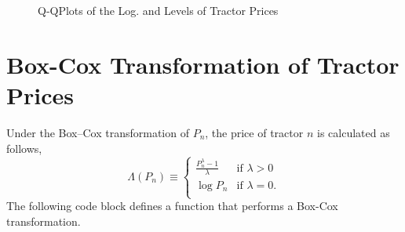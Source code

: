 \begin{figure}[!ht]
\hfill
{}

\caption{Q-QPlots of the Log. and Levels of Tractor Prices}
\label{fig:qq_prices}
\end{figure}





\pagebreak
\section{Box-Cox Transformation of Tractor Prices}

Under the Box--Cox transformation of $P_n$, the price of tractor $n$
is calculated as follows,
$$\Lambda(P_n)\equiv
  \begin{cases}
	\frac{P_n^\lambda-1}{\lambda}	& \textrm{if } \lambda > 0 \\
           \log P_n                     			& \textrm{if } \lambda = 0.\\
  \end{cases}
$$
The following code block defines a function that performs a
Box-Cox transformation.


